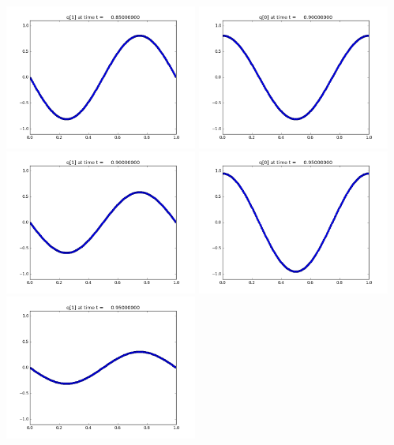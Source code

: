 \documentclass[11pt]{article}
\begin{document}
\includegraphics[width=0.475\textwidth]{frame0017fig1.png}
\vskip 10pt 
\includegraphics[width=0.475\textwidth]{frame0018fig0.png}
\includegraphics[width=0.475\textwidth]{frame0018fig1.png}
\vskip 10pt 
\includegraphics[width=0.475\textwidth]{frame0019fig0.png}
\includegraphics[width=0.475\textwidth]{frame0019fig1.png}
\end{document}
